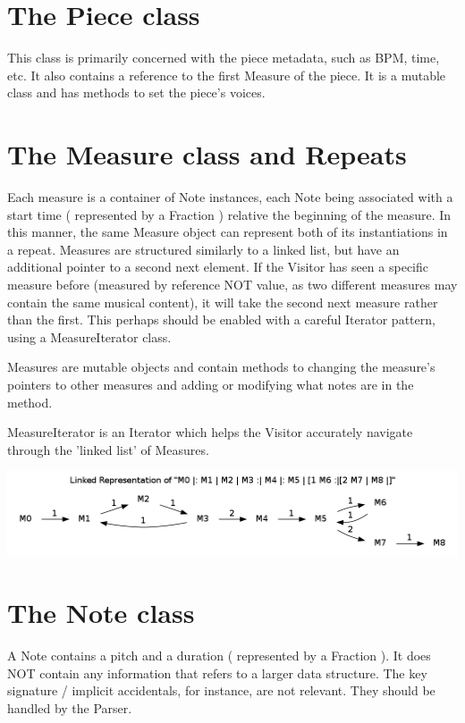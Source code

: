 \documentclass{amsart}
\begin{document}
\section{ The Piece class }

This class is primarily concerned with the piece metadata, such as BPM, time, etc. It also contains a reference to the first Measure of the piece.  It is a mutable class and has methods to set the piece's voices.  

\section{ The Measure class and Repeats }

Each measure is a container of Note instances, each Note being associated with a start time ( represented by a Fraction ) relative the beginning of the measure. In this manner, the same Measure object can represent both of its instantiations in a repeat. Measures are structured similarly to a linked list, but have an additional pointer to a second next element. If the Visitor has seen a specific measure before (measured by reference NOT value, as two different measures may contain the same musical content), it will take the second next measure rather than the first. This perhaps should be enabled with a careful Iterator pattern, using a MeasureIterator class.  

Measures are mutable objects and contain methods to changing the measure's pointers to other measures and adding or modifying what notes are in the method.  

MeasureIterator is an Iterator which helps the Visitor accurately navigate through the 'linked list' of Measures.  

\includegraphics[width=\linewidth]{measure_example.png}

\section{ The Note class }
A Note contains a pitch and a duration  ( represented by a Fraction ).  It does NOT contain any information that refers to a larger data structure. The key signature / implicit accidentals, for instance, are not relevant. They should be handled by the Parser.
\end{document}
